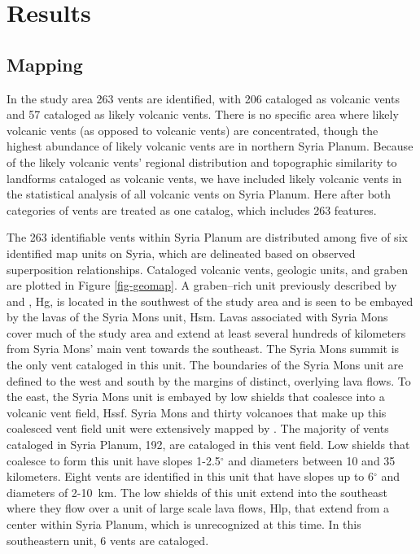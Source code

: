 \section{Results}

\subsection{Mapping}

In the study area 263 vents are identified, with 206 cataloged as volcanic vents and 57 cataloged as likely volcanic vents. There is no specific area where likely volcanic vents (as opposed to volcanic vents) are concentrated, though the highest abundance of likely volcanic vents are in northern Syria Planum. Because of the likely volcanic vents' regional distribution and topographic similarity to landforms cataloged as volcanic vents, we have included likely volcanic vents in the statistical analysis of all volcanic vents on Syria Planum. Here after both categories of vents are treated as one catalog, which includes 263 features.

The 263 identifiable vents within Syria Planum are distributed among five of six identified map units on Syria, which are delineated based on observed superposition relationships. Cataloged volcanic vents, geologic units, and graben are plotted in Figure \ref{fig-geomap}. A graben--rich unit previously described by \citet{baptista2008swarm} and \citet{Tanaka1988}, Hg, is located in the southwest of the study area and is seen to be embayed by the lavas of the Syria Mons unit, Hsm. Lavas associated with Syria Mons cover much of the study area and extend at least several hundreds of kilometers from Syria Mons' main vent towards the southeast. The Syria Mons summit is the only vent cataloged in this unit. The boundaries of the Syria Mons unit are defined to the west and south by the margins of distinct, overlying lava flows. To the east, the Syria Mons unit is embayed by low shields that coalesce into a volcanic vent field, Hssf. Syria Mons and thirty volcanoes that make up this coalesced vent field unit were extensively mapped by \citet{baptista2008swarm}. The majority of vents cataloged in Syria Planum, 192, are cataloged in this vent field. Low shields that coalesce to form this unit have slopes 1-2.5$^{\circ}$ and diameters between 10 and 35 kilometers. Eight vents are identified in this unit that have slopes up to 6$^{\circ}$ and diameters of 2-10~km. The low shields of this unit extend into the southeast where they flow over a unit of large scale lava flows, Hlp, that extend from a center within Syria Planum, which is unrecognized at this time. In this southeastern unit, 6 vents are cataloged.

